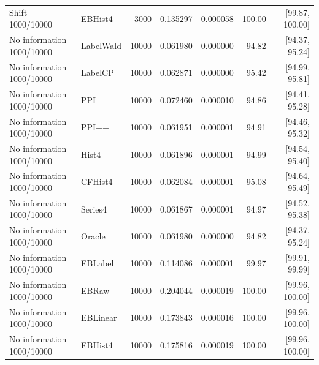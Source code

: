 \begin{longtable}{llrrrrr}
Shift 1000/10000 & EBHist4 & 3000 & 0.135297 & 0.000058 & 100.00 & [99.87, 100.00]\\
No information 1000/10000 & LabelWald & 10000 & 0.061980 & 0.000000 & 94.82 & [94.37, 95.24]\\
No information 1000/10000 & LabelCP & 10000 & 0.062871 & 0.000000 & 95.42 & [94.99, 95.81]\\
No information 1000/10000 & PPI & 10000 & 0.072460 & 0.000010 & 94.86 & [94.41, 95.28]\\
No information 1000/10000 & PPI++ & 10000 & 0.061951 & 0.000001 & 94.91 & [94.46, 95.32]\\
No information 1000/10000 & Hist4 & 10000 & 0.061896 & 0.000001 & 94.99 & [94.54, 95.40]\\
No information 1000/10000 & CFHist4 & 10000 & 0.062084 & 0.000001 & 95.08 & [94.64, 95.49]\\
No information 1000/10000 & Series4 & 10000 & 0.061867 & 0.000001 & 94.97 & [94.52, 95.38]\\
No information 1000/10000 & Oracle & 10000 & 0.061980 & 0.000000 & 94.82 & [94.37, 95.24]\\
No information 1000/10000 & EBLabel & 10000 & 0.114086 & 0.000001 & 99.97 & [99.91, 99.99]\\
No information 1000/10000 & EBRaw & 10000 & 0.204044 & 0.000019 & 100.00 & [99.96, 100.00]\\
No information 1000/10000 & EBLinear & 10000 & 0.173843 & 0.000016 & 100.00 & [99.96, 100.00]\\
No information 1000/10000 & EBHist4 & 10000 & 0.175816 & 0.000019 & 100.00 & [99.96, 100.00]\\
\bottomrule
\end{longtable}